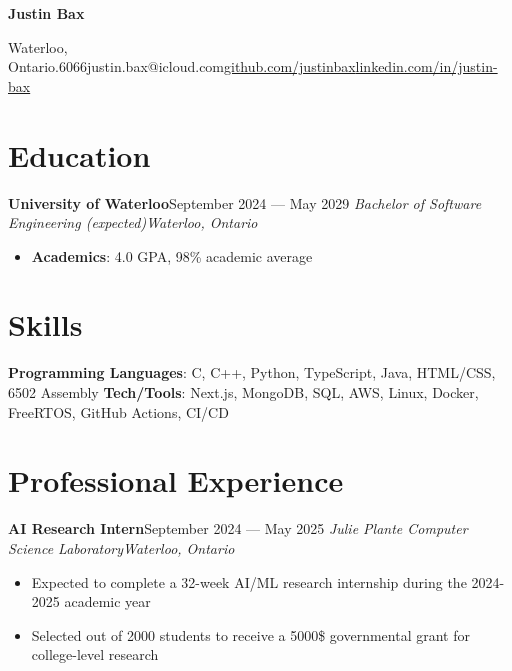\documentclass{article}
\newcommand{\cdelim}{\;\textbar\;}
\newcommand{\newrole}[4]{
    {\normalfont\textbf{#1}\hfill#3}
    \newline
    \textit{#2}\hfill\textit{#4}
}
\newenvironment{bulletpoints}{\begin{itemize}\setlength\itemsep{-0.2em}}{\end{itemize}}
\begin{document}
\begin{center}
    {\Huge\bfseries Justin Bax}\\\vspace*{2pt}

    Waterloo, Ontario\cdelim 438.763.6066\cdelim justin.bax@icloud.com\cdelim\href{https://github.com/justinbax}{github.com/justinbax}\cdelim\href{https://linkedin.com/in/justin-bax}{linkedin.com/in/justin-bax}\\
\end{center}

\section*{Education}

\newrole{University of Waterloo}{Bachelor of Software Engineering (expected)}{September 2024 --- May 2029}{Waterloo, Ontario}
\begin{bulletpoints}
    \vspace*{-2pt}
    \item {\bfseries Academics}: 4.0 GPA, 98\% academic average
\end{bulletpoints}


\section*{Skills}

{\bfseries Programming Languages}: C, C++, Python, TypeScript, Java, HTML/CSS, 6502 Assembly
\newline
{\bfseries Tech/Tools}: Next.js, MongoDB, SQL, AWS, Linux, Docker, FreeRTOS, GitHub Actions, CI/CD


\section*{Professional Experience}

\newrole{AI Research Intern}{Julie Plante Computer Science Laboratory}{September 2024 --- May 2025}{Waterloo, Ontario}
\begin{bulletpoints}
    \item Expected to complete a 32-week AI/ML research internship during the 2024-2025 academic year
    \item Selected out of 2000 students to receive a 5000\$ governmental grant for college-level research
\end{bulletpoints}
\end{document}
